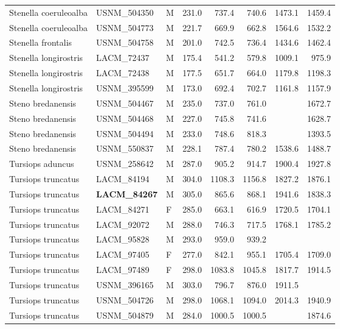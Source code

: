 \begin{table}[ht]
\begin{tabular}{lllrrrrr}
  Stenella coeruleoalba & USNM\_504350 & M & 231.0 & 737.4 & 740.6 & 1473.1 & 1459.4 \\ 
  Stenella coeruleoalba & USNM\_504773 & M & 221.7 & 669.9 & 662.8 & 1564.6 & 1532.2 \\ 
  Stenella frontalis & USNM\_504758 & M & 201.0 & 742.5 & 736.4 & 1434.6 & 1462.4 \\ 
  Stenella longirostris & LACM\_72437 & M & 175.4 & 541.2 & 579.8 & 1009.1 & 975.9 \\ 
  Stenella longirostris & LACM\_72438 & M & 177.5 & 651.7 & 664.0 & 1179.8 & 1198.3 \\ 
  Stenella longirostris & USNM\_395599 & M & 173.0 & 692.4 & 702.7 & 1161.8 & 1157.9 \\ 
  Steno bredanensis & USNM\_504467 & M & 235.0 & 737.0 & 761.0 &  & 1672.7 \\ 
  Steno bredanensis & USNM\_504468 & M & 227.0 & 745.8 & 741.6 &  & 1628.7 \\ 
  Steno bredanensis & USNM\_504494 & M & 233.0 & 748.6 & 818.3 &  & 1393.5 \\ 
  Steno bredanensis & USNM\_550837 & M & 228.1 & 787.4 & 780.2 & 1538.6 & 1488.7 \\ 
  Tursiops aduncus & USNM\_258642 & M & 287.0 & 905.2 & 914.7 & 1900.4 & 1927.8 \\ 
  Tursiops truncatus & LACM\_84194 & M & 304.0 & 1108.3 & 1156.8 & 1827.2 & 1876.1 \\ 
  Tursiops truncatus & \textbf{ LACM\_84267 } & M & 305.0 & 865.6 & 868.1 & 1941.6 & 1838.3 \\ 
  Tursiops truncatus & LACM\_84271 & F & 285.0 & 663.1 & 616.9 & 1720.5 & 1704.1 \\ 
  Tursiops truncatus & LACM\_92072 & M & 288.0 & 746.3 & 717.5 & 1768.1 & 1785.2 \\ 
  Tursiops truncatus & LACM\_95828 & M & 293.0 & 959.0 & 939.2 &  &  \\ 
  Tursiops truncatus & LACM\_97405 & F & 277.0 & 842.1 & 955.1 & 1705.4 & 1709.0 \\ 
  Tursiops truncatus & LACM\_97489 & F & 298.0 & 1083.8 & 1045.8 & 1817.7 & 1914.5 \\ 
  Tursiops truncatus & USNM\_396165 & M & 303.0 & 796.7 & 876.0 & 1911.5 &  \\ 
  Tursiops truncatus & USNM\_504726 & M & 298.0 & 1068.1 & 1094.0 & 2014.3 & 1940.9 \\ 
  Tursiops truncatus & USNM\_504879 & M & 284.0 & 1000.5 & 1000.5 &  & 1874.6 \\ 

\end{tabular}
\end{table}
